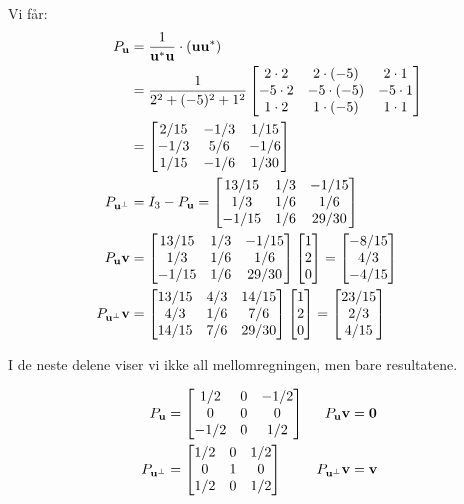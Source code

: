 \begin{losning}
\begin{punkt}
Vi får:
\begin{align*}
P_{\mathbf{u}}
&= \frac{1}{\mathbf{u}^* \mathbf{u}} \cdot (\mathbf{u} \mathbf{u}^*) \\
&= \frac{1}{2^2 + (-5)^2 + 1^2}
\begin{bmatrix}
 2 \cdot 2 &  2 \cdot (-5) &  2 \cdot 1 \\
-5 \cdot 2 & -5 \cdot (-5) & -5 \cdot 1 \\
 1 \cdot 2 &  1 \cdot (-5) &  1 \cdot 1
\end{bmatrix}
\\
&=
\begin{bmatrix}
2/15 & -1/3 & 1/15 \\
-1/3 &  5/6 & -1/6 \\
1/15 & -1/6 & 1/30
\end{bmatrix}
\\
P_{\mathbf{u}^\perp}
&= I_3 - P_{\mathbf{u}}
=
\begin{bmatrix}
13/15 & 1/3 & -1/15 \\
 1/3  & 1/6 &  1/6  \\
-1/15 & 1/6 & 29/30
\end{bmatrix}
\\
P_{\mathbf{u}} \mathbf{v}
&=
\begin{bmatrix}
13/15 & 1/3 & -1/15 \\
 1/3  & 1/6 &  1/6  \\
-1/15 & 1/6 & 29/30
\end{bmatrix}
\begin{bmatrix} 1 \\ 2 \\ 0 \end{bmatrix}
= \begin{bmatrix} -8/15 \\ 4/3 \\ -4/15 \end{bmatrix}
\\
P_{\mathbf{u}^\perp} \mathbf{v}
&=
\begin{bmatrix}
13/15 & 4/3 & 14/15 \\
 4/3  & 1/6 &  7/6  \\
14/15 & 7/6 & 29/30
\end{bmatrix}
\begin{bmatrix} 1 \\ 2 \\ 0 \end{bmatrix}
= \begin{bmatrix} 23/15 \\ 2/3 \\ 4/15 \end{bmatrix}
\end{align*}
\end{punkt}

\noindent
I de neste delene viser vi ikke all mellomregningen, men bare
resultatene.

\begin{punkt}
\vspace{-15pt}
\begin{align*}
P_{\mathbf{u}}
&=
\begin{bmatrix}
 1/2 & 0 & -1/2 \\
 0   & 0 & 0    \\
-1/2 & 0 &  1/2
\end{bmatrix}
&
P_{\mathbf{u}} \mathbf{v} &= \mathbf{0}
\\
P_{\mathbf{u}^\perp}
&=
\begin{bmatrix}
1/2 & 0 & 1/2 \\
0   & 1 & 0    \\
1/2 & 0 & 1/2
\end{bmatrix}
&
P_{\mathbf{u}^\perp} \mathbf{v} &= \mathbf{v}
\end{align*}
\end{punkt}


\end{losning}
